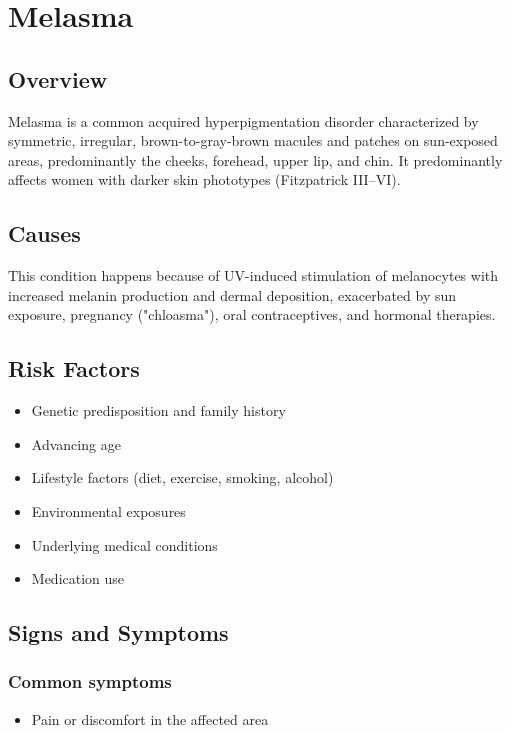 \chapter{Melasma}
\label{sec:Melasma}

\section{Overview}
Melasma is a common acquired hyperpigmentation disorder characterized by symmetric, irregular, brown-to-gray-brown macules and patches on sun-exposed areas, predominantly the cheeks, forehead, upper lip, and chin. It predominantly affects women with darker skin phototypes (Fitzpatrick III--VI).
\section{Causes}
This condition happens because of UV-induced stimulation of melanocytes with increased melanin production and dermal deposition, exacerbated by sun exposure, pregnancy ("chloasma"), oral contraceptives, and hormonal therapies.     
\section{Risk Factors}

\begin{itemize}[noitemsep]
  \item Genetic predisposition and family history
  \item Advancing age
  \item Lifestyle factors (diet, exercise, smoking, alcohol)
  \item Environmental exposures
  \item Underlying medical conditions
  \item Medication use
\end{itemize}
\section{Signs and Symptoms}

\subsection{Common symptoms}
\begin{itemize}[noitemsep]
  \item Pain or discomfort in the affected area
  \end{itemize}

